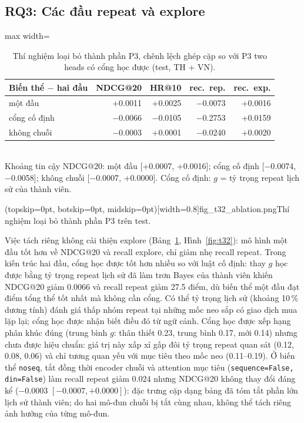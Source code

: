 \documentclass[jtehm]{ieeeaccess}
\begin{document}
\subsection{RQ3: Các đầu repeat và explore}

\begin{table}[t]
\caption{Thí nghiệm loại bỏ thành phần P3, chênh lệch ghép cặp so với P3 two heads có cổng học được (test, TH + VN).}
\label{tab:t32}
\setlength{\tabcolsep}{2.5pt}
\centering
\begin{adjustbox}{max width=\columnwidth}
\begin{tabular}{lrrrr}
\toprule
Biến thể $-$ hai đầu & NDCG@20 & HR@10 & rec.\ rep. & rec.\ exp. \\
\midrule
một đầu                & +0.0011 & +0.0025 & $-$0.0073 & +0.0016 \\
cổng cố định           & $-$0.0066 & $-$0.0105 & $-$0.2753 & +0.0159 \\
không chuỗi             & $-$0.0003 & +0.0001 & $-$0.0240 & +0.0020 \\
\bottomrule
\end{tabular}
\end{adjustbox}
\\[1ex]
{\footnotesize Khoảng tin cậy NDCG@20: một đầu [+0.0007, +0.0016]; cổng cố định [$-$0.0074, $-$0.0058]; không chuỗi [$-$0.0007, +0.0000].
Cổng cố định: $g$ = tỷ trọng repeat lịch sử của thành viên.}
\end{table}

\Figure[t!](topskip=0pt, botskip=0pt, midskip=0pt)[width=0.8\textwidth]{fig_t32_ablation.png}{Thí nghiệm loại bỏ thành phần P3 trên test.\label{fig:t32}}

Việc tách riêng không cải thiện explore (Bảng~\ref{tab:t32}, Hình~\ref{fig:t32}): mô hình một đầu tốt hơn về NDCG@20 và recall explore, chỉ giảm nhẹ recall repeat. Trong kiến trúc hai đầu, cổng học được tốt hơn nhiều so với luật cố định: thay $g$ học được bằng tỷ trọng repeat lịch sử đã làm trơn Bayes của thành viên khiến NDCG@20 giảm 0.0066 và recall repeat giảm 27.5 điểm, dù biến thể một đầu đạt điểm tổng thể tốt nhất mà không cần cổng. Có thể tỷ trọng lịch sử (khoảng 10\,\% dương tính) đánh giá thấp nhóm repeat tại những mốc neo sắp có giao dịch mua lặp lại; cổng học được nhận biết điều đó từ ngữ cảnh. Cổng học được xếp hạng phân khúc đúng (trung bình $g$: thân thiết 0.23, trung bình 0.17, mới 0.14) nhưng chưa được hiệu chuẩn: giá trị này xấp xỉ gấp đôi tỷ trọng repeat quan sát (0.12, 0.08, 0.06) và chỉ tương quan yếu với mục tiêu theo mốc neo (0.11--0.19). Ở biến thể \texttt{noseq}, tắt đồng thời encoder chuỗi và attention mục tiêu (\texttt{sequence=False, din=False}) làm recall repeat giảm $0.024$ nhưng NDCG@20 không thay đổi đáng kể ($-0.0003$ $[-0.0007, +0.0000]$): đặc trưng cặp dạng bảng đã tóm tắt phần lớn lịch sử thành viên; do hai mô-đun chuỗi bị tắt cùng nhau, không thể tách riêng ảnh hưởng của từng mô-đun.
\end{document}
